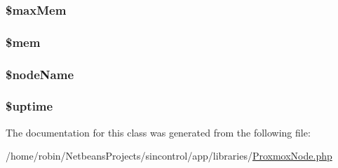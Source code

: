\subsubsection[{\$max\+Mem}]{\setlength{\rightskip}{0pt plus 5cm}\$max\+Mem\hspace{0.3cm}{\ttfamily [private]}}\label{class_proxmox_node_abc95a089e449295ed173281588cdfe99}
\hypertarget{class_proxmox_node_a8e3496925e682c8e4155ad720f98fb8d}{}
\subsubsection[{\$mem}]{\setlength{\rightskip}{0pt plus 5cm}\$mem\hspace{0.3cm}{\ttfamily [private]}}\label{class_proxmox_node_a8e3496925e682c8e4155ad720f98fb8d}
\hypertarget{class_proxmox_node_a76e04ac0636b0a3f1b820b18f58b3324}{}
\subsubsection[{\$node\+Name}]{\setlength{\rightskip}{0pt plus 5cm}\$node\+Name\hspace{0.3cm}{\ttfamily [private]}}\label{class_proxmox_node_a76e04ac0636b0a3f1b820b18f58b3324}
\hypertarget{class_proxmox_node_ac7ce7d11810b7d37cb8bfb3406eea721}{}
\subsubsection[{\$uptime}]{\setlength{\rightskip}{0pt plus 5cm}\$uptime\hspace{0.3cm}{\ttfamily [private]}}\label{class_proxmox_node_ac7ce7d11810b7d37cb8bfb3406eea721}


The documentation for this class was generated from the following file\+:\begin{DoxyCompactItemize}
\item 
/home/robin/\+Netbeans\+Projects/sincontrol/app/libraries/\hyperlink{_proxmox_node_8php}{Proxmox\+Node.\+php}\end{DoxyCompactItemize}
